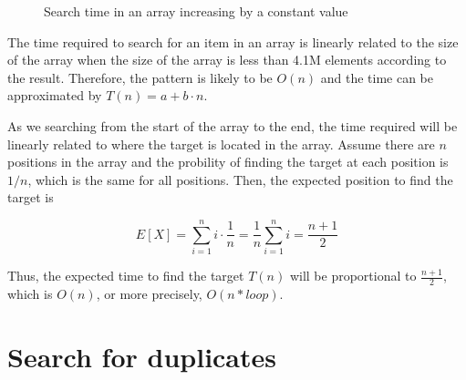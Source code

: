 \documentclass[a4paper,11pt]{article}
\begin{document}
\begin{figure}[H]
  \centering
  \caption{Search time in an array increasing by a constant value}
  \label{fig:search_v2}
\end{figure}

The time required to search for an item in an array is linearly related to the size of the array when
the size of the array is less than 4.1M elements according to the result. Therefore, the pattern is likely to be $O(n)$ and
the time can be approximated by $T(n) = a + b \cdot n$.

As we searching from the start of the array to the end, the time required will be linearly related to
where the target is located in the array.
Assume there are $n$ positions in the array and the probility of finding the target at each position
is $1/n$, which is the same for all positions. Then, the expected position to find the target is

\begin{equation}		
  E[X] = \sum_{i=1}^{n} i \cdot \frac{1}{n} = \frac{1}{n} \sum_{i=1}^{n} i = \frac{n+1}{2}
\end{equation}

Thus, the expected time to find the target $T(n)$ will be proportional to $\frac{n+1}{2}$, 
which is $O(n)$, or more precisely, $O(n * loop)$.

\section*{Search for duplicates}
\end{document}
